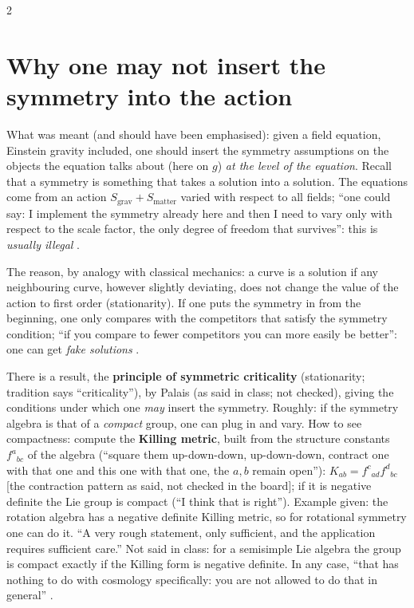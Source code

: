 \begin{paracol}{2}
\section{Why one may not insert the symmetry into the action}\label{sec:c21-palais}

What was meant (and should have been emphasised): given a field equation, Einstein gravity included, one should insert the symmetry assumptions on the objects the equation talks about (here on $g$) \emph{at the level of the equation}. Recall that a symmetry is something that takes a solution into a solution. The equations come from an action $S_{\mathrm{grav}}+S_{\mathrm{matter}}$ varied with respect to all fields; ``one could say: I implement the symmetry already here and then I need to vary only with respect to the scale factor, the only degree of freedom that survives'': this is \emph{usually illegal} .

The reason, by analogy with classical mechanics: a curve is a solution if any neighbouring curve, however slightly deviating, does not change the value of the action to first order (stationarity). If one puts the symmetry in from the beginning, one only compares with the competitors that satisfy the symmetry condition; ``if you compare to fewer competitors you can more easily be better'': one can get \emph{fake solutions} .

\begin{aside}
There is a result, the \textbf{principle of symmetric criticality} (stationarity; tradition says ``criticality''), by Palais (as said in class; not checked), giving the conditions under which one \emph{may} insert the symmetry. Roughly: if the symmetry algebra is that of a \emph{compact} group, one can plug in and vary. How to see compactness: compute the \textbf{Killing metric}, built from the structure constants $f^a{}_{bc}$ of the algebra (``square them up-down-down, up-down-down, contract one with that one and this one with that one, the $a,b$ remain open''): $K_{ab}=f^c{}_{ad}f^d{}_{bc}$ [the contraction pattern as said, not checked in the board]; if it is negative definite the Lie group is compact (``I think that is right''). Example given: the rotation algebra has a negative definite Killing metric, so for rotational symmetry one can do it. ``A very rough statement, only sufficient, and the application requires sufficient care.'' Not said in class: for a semisimple Lie algebra the group is compact exactly if the Killing form is negative definite. In any case, ``that has nothing to do with cosmology specifically: you are not allowed to do that in general'' .
\end{aside}


\end{paracol}
